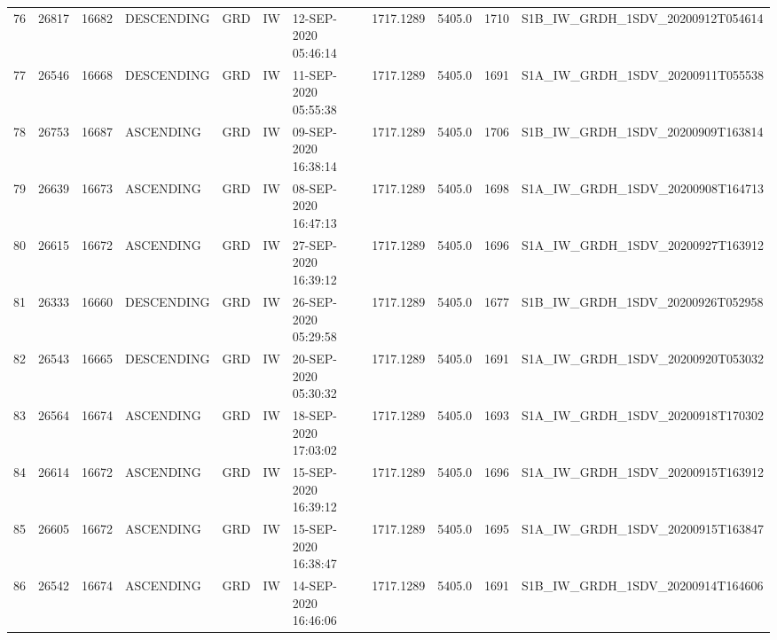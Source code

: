 \begin{tabular}{lrrllllllll}
76  &  26817 &   16682 &  DESCENDING &          GRD &              IW &  12-SEP-2020 05:46:14 &                  1717.1289 &          5405.0 &       1710 &  S1B\_IW\_GRDH\_1SDV\_20200912T054614 \\
77  &  26546 &   16668 &  DESCENDING &          GRD &              IW &  11-SEP-2020 05:55:38 &                  1717.1289 &          5405.0 &       1691 &  S1A\_IW\_GRDH\_1SDV\_20200911T055538 \\
78  &  26753 &   16687 &   ASCENDING &          GRD &              IW &  09-SEP-2020 16:38:14 &                  1717.1289 &          5405.0 &       1706 &  S1B\_IW\_GRDH\_1SDV\_20200909T163814 \\
79  &  26639 &   16673 &   ASCENDING &          GRD &              IW &  08-SEP-2020 16:47:13 &                  1717.1289 &          5405.0 &       1698 &  S1A\_IW\_GRDH\_1SDV\_20200908T164713 \\
80  &  26615 &   16672 &   ASCENDING &          GRD &              IW &  27-SEP-2020 16:39:12 &                  1717.1289 &          5405.0 &       1696 &  S1A\_IW\_GRDH\_1SDV\_20200927T163912 \\
81  &  26333 &   16660 &  DESCENDING &          GRD &              IW &  26-SEP-2020 05:29:58 &                  1717.1289 &          5405.0 &       1677 &  S1B\_IW\_GRDH\_1SDV\_20200926T052958 \\
82  &  26543 &   16665 &  DESCENDING &          GRD &              IW &  20-SEP-2020 05:30:32 &                  1717.1289 &          5405.0 &       1691 &  S1A\_IW\_GRDH\_1SDV\_20200920T053032 \\
83  &  26564 &   16674 &   ASCENDING &          GRD &              IW &  18-SEP-2020 17:03:02 &                  1717.1289 &          5405.0 &       1693 &  S1A\_IW\_GRDH\_1SDV\_20200918T170302 \\
84  &  26614 &   16672 &   ASCENDING &          GRD &              IW &  15-SEP-2020 16:39:12 &                  1717.1289 &          5405.0 &       1696 &  S1A\_IW\_GRDH\_1SDV\_20200915T163912 \\
85  &  26605 &   16672 &   ASCENDING &          GRD &              IW &  15-SEP-2020 16:38:47 &                  1717.1289 &          5405.0 &       1695 &  S1A\_IW\_GRDH\_1SDV\_20200915T163847 \\
86  &  26542 &   16674 &   ASCENDING &          GRD &              IW &  14-SEP-2020 16:46:06 &                  1717.1289 &          5405.0 &       1691 &  S1B\_IW\_GRDH\_1SDV\_20200914T164606 \\

\end{tabular}
